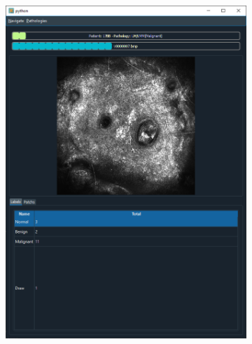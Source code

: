 \begin{figure}[H]
\centering
    \begin{subfigure}{.45\textwidth}
      \centering
      \includegraphics[width=\linewidth]{contents/ii_preamble_microscopy/resources/example_gui_annotation_1.png}
    \end{subfigure}
    \begin{subfigure}{.45\textwidth}
      \centering

\end{subfigure}
\end{figure}
